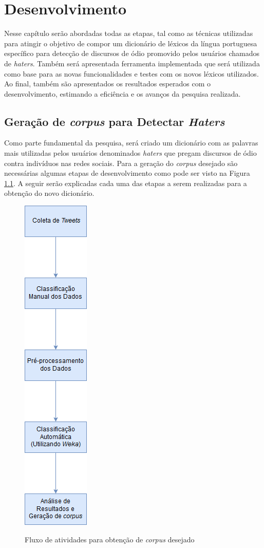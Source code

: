 \chapter{Desenvolvimento}
\label{cap:Desenvolvimento}
Nesse capítulo serão abordadas todas as etapas, tal como as técnicas utilizadas para atingir o objetivo de compor um dicionário de léxicos da língua portuguesa específico para detecção de discursos de ódio promovido pelos usuários chamados de \textit{haters}. Também será apresentada ferramenta implementada que será utilizada como base para as novas funcionalidades e testes com os novos léxicos utilizados. Ao final, também são apresentados os resultados esperados com o desenvolvimento, estimando a eficiência e os avanços da pesquisa realizada. 

\section{Geração de \textit{corpus} para Detectar \textit{Haters}}
\label{sec:geracaohater}
Como parte fundamental da pesquisa, será criado um dicionário com as palavras mais utilizadas pelos usuários denominados \textit{haters} que pregam discursos de ódio contra indivíduos nas redes sociais. Para a geração do \textit{corpus} desejado são necessárias algumas etapas de desenvolvimento como pode ser visto na Figura \ref{fig:fluxodesenvolvimento}. A seguir serão explicadas cada uma das etapas a serem realizadas para a obtenção do novo dicionário.

\begin{figure}[!h]
\centering 
\caption{Fluxo de atividades para obtenção de \textit{corpus} desejado}
\includegraphics[scale=0.45]{imagens/fluxodesenvolvimento.png}
\label{fig:fluxodesenvolvimento}
\end{figure}

